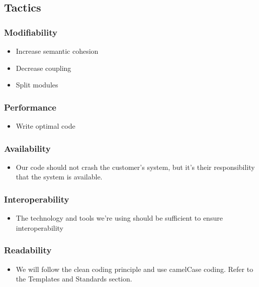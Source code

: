 \subsection{Tactics}
\subsubsection{Modifiability}
\begin{itemize}
\item Increase semantic cohesion
\item Decrease coupling
\item Split modules
\end{itemize}

\subsubsection{Performance}
\begin{itemize}
\item Write optimal code
\end{itemize}

\subsubsection{Availability}
\begin{itemize}
\item Our code should not crash the customer's system, but it's their responsibility that the system is available.
\end{itemize}

\subsubsection{Interoperability}
\begin{itemize}
\item The technology and tools we're using should be sufficient to ensure interoperability
\end{itemize}

\subsubsection{Readability}
\begin{itemize}
\item We will follow the clean coding principle and use camelCase coding. Refer to the Templates and Standards section.
\end{itemize}
